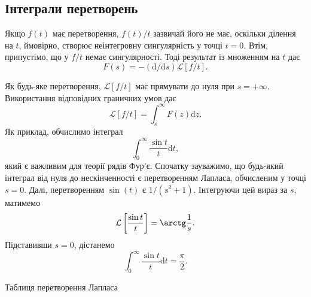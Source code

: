 \documentclass[14pt,twoside]{extreport}
\theoremstyle{mystyle}
\numberwithin{equation}{chapter}
\begin{document}
\subsection{Інтеграли перетворень}

Якщо $f(t)$ має перетворення, $f(t)/t$ зазвичай його не має, оскільки ділення на $t$, ймовірно, створює неінтегровну сингулярність у точці $t=0$. Втім, припустімо, що у $f/t$ немає сингулярності. Тоді результат із множенням на $t$ дає
\begin{equation*}
	F(s)=-(\mathrm{d}/\mathrm{d}s)\mathcal{L}[f/t].
\end{equation*}

Як будь-яке перетворення, $\mathcal{L}[f/t]$ має прямувати до нуля при $ s=+\infty$. Використання відповідних граничних умов дає
\begin{equation*}
	\mathcal{L}[f/t]=\displaystyle \int_{s}^{\infty}F(z)\mathrm{d}z.
\end{equation*}
Як приклад, обчислимо інтеграл
\begin{equation*}
	\displaystyle \int_{0}^{\infty}\frac{\sin t}{t}\mathrm{d}t,
\end{equation*}
який є важливим для теорії рядів Фур'є. Спочатку зауважимо, що будь-який інтеграл від нуля до нескінченності є перетворенням Лапласа, обчисленим у точці $s=0$. Далі, перетворенням $\sin(t)$ є $1/(s^{2}+1)$. Інтегруючи цей вираз за $s$, матимемо
\begin{equation*}
	\mathcal{L}\left[\dfrac{\sin t}{t}\right]=\arctg\dfrac{1}{s}.
\end{equation*}
Підставивши $s=0$, дістанемо
\begin{equation*}
	\displaystyle \int_{0}^{\infty}\frac{\sin t}{t}\mathrm{d}t=\frac{\pi}{2}.
\end{equation*}
\newpage
\begin{center}
	\begin{LARGE}
		Таблиця перетворення Лапласа
	\end{LARGE}
\end{center}
\end{document}
